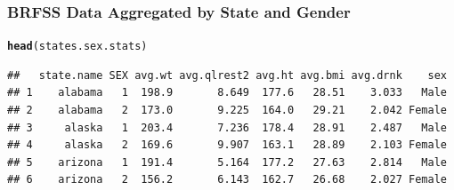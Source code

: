 \documentclass{beamer}\usepackage[]{graphicx}\usepackage[]{color}
\makeatletter
\newcommand{\hlstd}[1]{\textcolor[rgb]{0.345,0.345,0.345}{#1}}%
\newcommand{\hlkwd}[1]{\textcolor[rgb]{0.737,0.353,0.396}{\textbf{#1}}}%
\newenvironment{kframe}{%
 \def\at@end@of@kframe{}%
 \ifinner\ifhmode%
  \def\at@end@of@kframe{\end{minipage}}%
  \begin{minipage}{\columnwidth}%
 \fi\fi%
 \def\FrameCommand##1{\hskip\@totalleftmargin \hskip-\fboxsep
 \colorbox{shadecolor}{##1}\hskip-\fboxsep
     \hskip-\linewidth \hskip-\@totalleftmargin \hskip\columnwidth}%
 \MakeFramed {\advance\hsize-\width
   \@totalleftmargin\z@ \linewidth\hsize
   \@setminipage}}%
 {\par\unskip\endMakeFramed%
 \at@end@of@kframe}
\newenvironment{knitrout}{}{} %
\makeatother
\begin{document}

\begin{frame}[fragile]
    \frametitle{BRFSS Data Aggregated by State and Gender}
    
    \small
\begin{knitrout}\footnotesize
{}\color{fgcolor}\begin{kframe}
\begin{alltt}
\hlkwd{head}\hlstd{(states.sex.stats)}
\end{alltt}
\begin{verbatim}
##   state.name SEX avg.wt avg.qlrest2 avg.ht avg.bmi avg.drnk    sex
## 1    alabama   1  198.9       8.649  177.6   28.51    3.033   Male
## 2    alabama   2  173.0       9.225  164.0   29.21    2.042 Female
## 3     alaska   1  203.4       7.236  178.4   28.91    2.487   Male
## 4     alaska   2  169.6       9.907  163.1   28.89    2.103 Female
## 5    arizona   1  191.4       5.164  177.2   27.63    2.814   Male
## 6    arizona   2  156.2       6.143  162.7   26.68    2.027 Female
\end{verbatim}
\end{kframe}
\end{knitrout}

    \normalsize
\end{frame}


\end{document}
